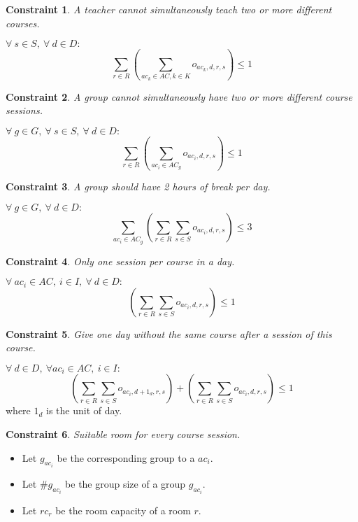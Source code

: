 \documentclass[12pt,a4paper]{article}
\newtheorem{theorem}{Constraint}
\begin{document}
\begin{theorem}
A teacher cannot simultaneously teach two or more different courses.
\end{theorem}
$
\forall \ s \in S,\ \forall \ d \in D : 
$
\begin{equation}
\sum_{r\in R}\left(\sum_{ac_k \in AC, k \in K}{o_{ac_{k}, d, r, s}}\right) \leq 1
\end{equation}

\begin{theorem}
A group cannot simultaneously have two or more different course sessions.
\end{theorem}
$
\forall \ g \in G, \ \forall	\ s \in S, \ \forall \ d \in D :
$
\begin{equation}
\sum_{r\in R}\left(\sum_{ac_i \in AC_g}{o_{ac_{i}, d, r, s}}\right) \leq 1
\end{equation}
\begin{theorem}
A group should have 2 hours of break per day.
\end{theorem}
$
\forall \ g \in G, \ \forall \ d \in D :
$
\begin{equation}
\sum_{ac_{i} \in AC_{g}}\left(\sum_{r\in R}{\sum_{s \in S}{o_{ac_{i}, d, r, s}}}\right) \leq 3
\end{equation}
\begin{theorem}
Only one session per course in a day.
\end{theorem}
$
\forall \ ac_i \in AC,\ i \in I, \ \forall \ d \in D :
$
\begin{equation}
\left(\sum_{r\in R}{\sum_{s \in S}{o_{ac_{i}, d, r, s}}}\right) \leq 1
\end{equation}
\begin{theorem}
Give one day without the same course after a session of this course.
\end{theorem}
$
\forall \ d \in D, \ \forall ac_i \in AC, \ i \in I:
$
\begin{equation}
\left(\sum_{r\in R}{\sum_{s \in S}{o_{ac_{i}, d + 1_d, r, s}}}\right) + \left(\sum_{r\in R}{\sum_{s \in S}{o_{ac_{i}, d, r, s}}}\right) \leq 1
\end{equation}
where $1_d$ is the unit of day.

\begin{theorem}
Suitable room for every course session.
\end{theorem}

\begin{itemize}
	\item Let $g_{ac_{i}}$ be the corresponding group to a ${ac_{i}}$.
	\item Let $\#g_{ac_{i}}$ be the group size of a group $g_{ac_{i}}$.
	\item Let $rc_r$ be the room capacity of a room $r$.
\end{itemize}
\end{document}
